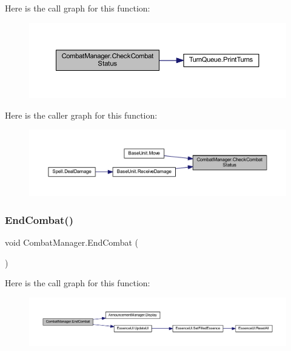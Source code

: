 Here is the call graph for this function\+:\nopagebreak
\begin{figure}[H]
\begin{center}
\leavevmode
\includegraphics[width=350pt]{class_combat_manager_aea6dfda807c4ec793ed26c5d220b84fb_cgraph}
\end{center}
\end{figure}
Here is the caller graph for this function\+:\nopagebreak
\begin{figure}[H]
\begin{center}
\leavevmode
\includegraphics[width=350pt]{class_combat_manager_aea6dfda807c4ec793ed26c5d220b84fb_icgraph}
\end{center}
\end{figure}
\mbox{\label{class_combat_manager_a8d14cf9a8265e20264151a615e309f12}} 
\subsubsection{\texorpdfstring{EndCombat()}{EndCombat()}}
{\footnotesize\ttfamily void Combat\+Manager.\+End\+Combat (\begin{DoxyParamCaption}{ }\end{DoxyParamCaption})}

Here is the call graph for this function\+:\nopagebreak
\begin{figure}[H]
\begin{center}
\leavevmode
\includegraphics[width=350pt]{class_combat_manager_a8d14cf9a8265e20264151a615e309f12_cgraph}
\end{center}
\end{figure}
\mbox{\label{class_combat_manager_ae306deb3898e096bf5ad6cdd705b82fa}} 
